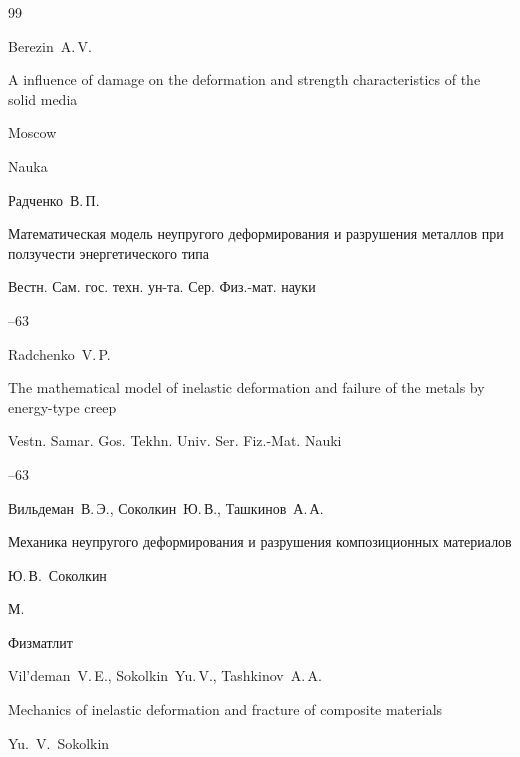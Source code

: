 \begin{thebibliography}{99}
\misctransl

\by Berezin~A.\,V.

\book A influence of damage on the deformation and strength characteristics of the solid media

\publaddr Moscow

\publ Nauka










\by Радченко~В.\,П.

\paper Математическая модель неупругого деформирования и разрушения металлов при ползучести энергетического типа

\jour Вестн. Сам. гос. техн. ун-та. Сер. Физ.-мат. науки



--63


\misctransl

\by Radchenko~V.\,P.

\paper The mathematical model of inelastic deformation and failure of the metals by energy-type creep

\jour Vestn. Samar. Gos. Tekhn. Univ. Ser. Fiz.-Mat. Nauki



--63




\by Вильдеман~В.\,Э., Соколкин~Ю.\,В., Ташкинов~А.\,А.

\book Механика неупругого деформирования и разрушения композиционных материалов

\ed Ю.\,В.~Соколкин

\publaddr М.

\publ  Физматлит



\misctransl

\by Vil'deman~V.\,E., Sokolkin~Yu.\,V., Tashkinov~A.\,A.

\book Mechanics of inelastic deformation and fracture of composite materials

\ed Yu.~V.~Sokolkin


\end{thebibliography}
